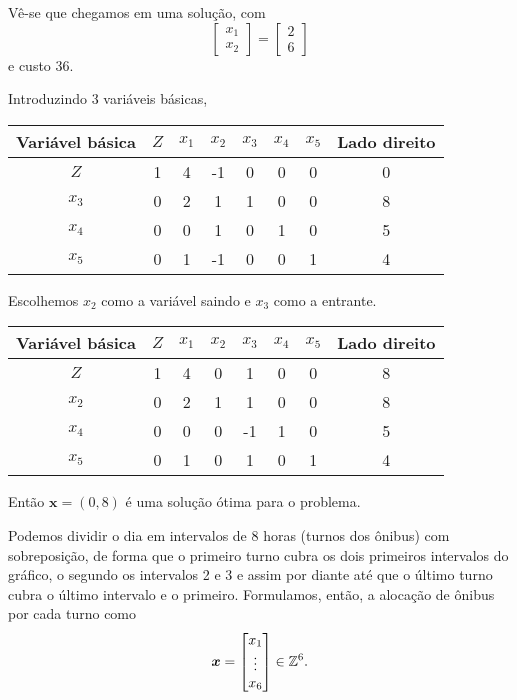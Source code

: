 \documentclass[a4paper]{report}
\begin{document}
Vê-se que chegamos em uma solução, com \[
\begin{bmatrix} x_1 \\ x_2 \end{bmatrix} = \begin{bmatrix} 2 \\ 6 \end{bmatrix} 
\] e custo 36.


Introduzindo 3 variáveis básicas,

\begin{table}[H]
    \centering
    \begin{tabular}{c | c | c | c | c | c | c | c}
	Variável básica  & $Z$ & $x_1$ & $x_2$ & $x_3$ & $x_4$ & $x_5$ & Lado direito  \\
    \hline
	$Z$ & 1 & 4 & -1 & 0 & 0 & 0 & 0 \\
	$x_3$ & 0 & 2 & 1 & 1 & 0 & 0 & 8 \\
	$x_4$ & 0 & 0 & 1 & 0 & 1 & 0 & 5 \\
	$x_5$ & 0 & 1 & -1 & 0 & 0 & 1 & 4
    \end{tabular}
\end{table}

Escolhemos $x_2$ como a variável saindo e $x_3$ como a entrante.

\begin{table}[H]
    \centering
    \begin{tabular}{c | c | c | c | c | c | c | c}
	Variável básica  & $Z$ & $x_1$ & $x_2$ & $x_3$ & $x_4$ & $x_5$ & Lado direito  \\
    \hline
	$Z$ & 1 & 4 & 0 & 1 & 0 & 0 & 8 \\
	$x_2$ & 0 & 2 & 1 & 1 & 0 & 0 & 8 \\
	$x_4$ & 0 & 0 & 0 & -1 & 1 & 0 & 5 \\
	$x_5$ & 0 & 1 & 0 & 1 & 0 & 1 & 4
    \end{tabular}
\end{table}

Então $\bm{x} = \left( 0, 8 \right) $ é uma solução ótima para o problema.


Podemos dividir o dia em intervalos de 8 horas (turnos dos ônibus) com sobreposição, de forma que o primeiro turno cubra os dois primeiros intervalos do gráfico, o segundo os intervalos 2 e 3 e assim por diante até que o último turno cubra o último intervalo e o primeiro. Formulamos, então, a alocação de ônibus por cada turno como \[
    \bm{x} = \begin{bmatrix} x_1 \\ \vdots \\ x_6 \end{bmatrix} \in \mathbb{Z}^{6}
.\] 
\end{document}

